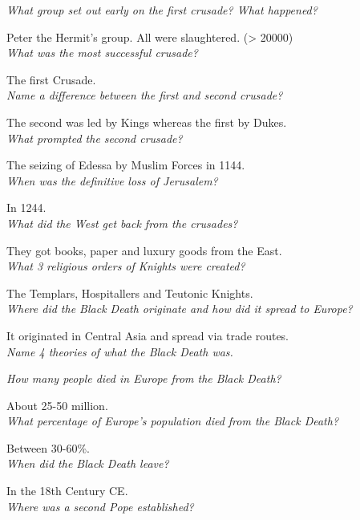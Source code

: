 \documentclass[12pt]{article}
\begin{document}
\textit{What group set out early on the first crusade? What happened?}

Peter the Hermit's group. All were slaughtered. (> 20000) \\

\textit{What was the most successful crusade?}

The first Crusade.\\

\textit{Name a difference between the first and second crusade?}

The second was led by Kings whereas the first by Dukes.\\

\textit{What prompted the second crusade?}

The seizing of Edessa by Muslim Forces in 1144. \\

\textit{When was the definitive loss of Jerusalem?}

In 1244. \\

\textit{What did the West get back from the crusades?}

They got books, paper and luxury goods from the East.\\

\textit{What 3 religious orders of Knights were created?}

The Templars, Hospitallers and Teutonic Knights.\\

\textit{Where did the Black Death originate and how did it spread to Europe?}

It originated in Central Asia and spread via trade routes.\\

\textit{Name 4 theories of what the Black Death was.}

\textit{How many people died in Europe from the Black Death?}

About 25-50 million.\\

\textit{What percentage of Europe's population died from the Black Death?}

Between 30-60\%.\\

\textit{When did the Black Death leave?}

In the 18th Century CE. \\

\textit{Where was a second Pope established?}
\end{document}
